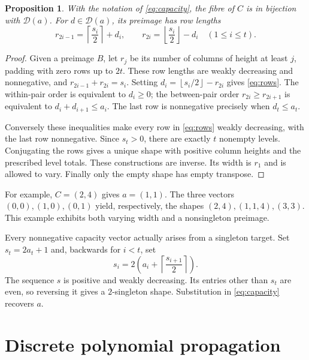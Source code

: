 \documentclass[11pt]{article}
\newtheorem{proposition}[theorem]{Proposition}
\theoremstyle{remark}
\begin{document}
\begin{proposition}\label{prop:bijection}
With the notation of \eqref{eq:capacity}, the fibre of $C$ is in bijection
with $\mathcal D(a)$. For $d\in\mathcal D(a)$, its preimage has row lengths
\begin{equation}\label{eq:rows}
 r_{2i-1}=\left\lceil \frac{s_i}{2}\right\rceil+d_i,
 \qquad r_{2i}=\left\lfloor \frac{s_i}{2}\right\rfloor-d_i
 \quad(1\leq i\leq t).
\end{equation}
\end{proposition}
\begin{proof}
Given a preimage $B$, let $r_j$ be its number of columns of height at
least $j$, padding with zero rows up to $2t$. These row lengths are
weakly decreasing and nonnegative, and
$r_{2i-1}+r_{2i}=s_i$. Setting
$d_i=\left\lfloor s_i/2\right\rfloor-r_{2i}$ gives \eqref{eq:rows}.
The within-pair order is equivalent to $d_i\geq0$; the between-pair
order $r_{2i}\geq r_{2i+1}$ is equivalent to
$d_i+d_{i+1}\leq a_i$. The last row is nonnegative precisely when
$d_t\leq a_t$.

Conversely these inequalities make every row in \eqref{eq:rows}
weakly decreasing, with the last row nonnegative. Since $s_t>0$,
there are exactly $t$ nonempty levels. Conjugating the rows gives a
unique shape with positive column heights and the prescribed level
totals. These constructions are inverse. Its width is $r_1$ and is
allowed to vary. Finally only the empty shape has empty transpose.
\end{proof}

For example, $C=(2,4)$ gives $a=(1,1)$. The three vectors
$(0,0),(1,0),(0,1)$ yield, respectively, the shapes
$(2,4),(1,1,4),(3,3)$. This example exhibits both varying width and a
nonsingleton preimage.

Every nonnegative capacity vector actually arises from a singleton
target. Set $s_t=2a_t+1$ and, backwards for $i<t$, set
\[
 s_i=2\left(a_i+\left\lceil \frac{s_{i+1}}2\right\rceil\right).
\]
The sequence $s$ is positive and weakly decreasing. Its entries other
than $s_t$ are even, so reversing it gives a $2$-singleton shape.
Substitution in \eqref{eq:capacity} recovers $a$.

\section{Discrete polynomial propagation}
\end{document}
